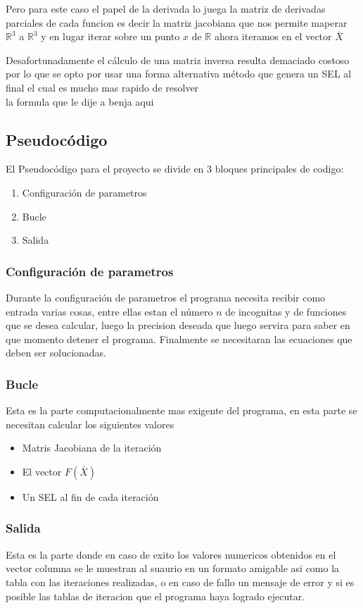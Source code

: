 \documentclass[11pt]{article}
\begin{document}
Pero para este caso el papel de la derivada lo juega la matriz de derivadas parciales de cada funcion es decir la matriz jacobiana que nos permite maperar  $\mathbb{R}^3$ a $\mathbb{R}^3$ y en lugar iterar sobre un punto $x$ de $\mathbb{R}$  ahora iteramos en el vector $\bar{X}$

Desafortunadamente el cálculo de una matriz inversa resulta demaciado costoso por lo que se opto por usar una forma alternativa método que genera un SEL al final el cual es mucho mas rapido de resolver\\

{la formula que le dije a benja aqui }

\subsection{Pseudocódigo}
El Pseudocódigo para el proyecto se divide en 3 bloques principales de codigo:
\begin{enumerate}
  \item Configuración de parametros
  \item Bucle
  \item Salida
\end{enumerate}

\subsubsection{Configuración de parametros}
Durante la configuración de parametros el programa necesita recibir como entrada varias cosas, entre ellas estan el número  $n$ de incognitas y de funciones que se desea calcular, luego la precision deseada que luego servira para saber en que momento detener el programa. Finalmente se necesitaran las ecuaciones que deben ser solucionadas.

\subsubsection{Bucle}
Esta es la parte computacionalmente mas exigente del programa, en esta parte se necesitan calcular los siguientes valores
\begin{itemize}
  \item Matris Jacobiana de la iteración
  \item El vector $F(\bar{X})$
  \item Un SEL al fin de cada iteración
\end{itemize}
\subsubsection{Salida}
Esta es la parte donde en caso de exito los valores numericos obtenidos en el vector columna se le muestran al suaurio en un formato amigable asi como la tabla con las iteraciones realizadas, o en caso de fallo un mensaje de error y si es posible las tablas de iteracion que el programa haya logrado ejecutar.  
\clearpage

\nocite{*}

\end{document}
